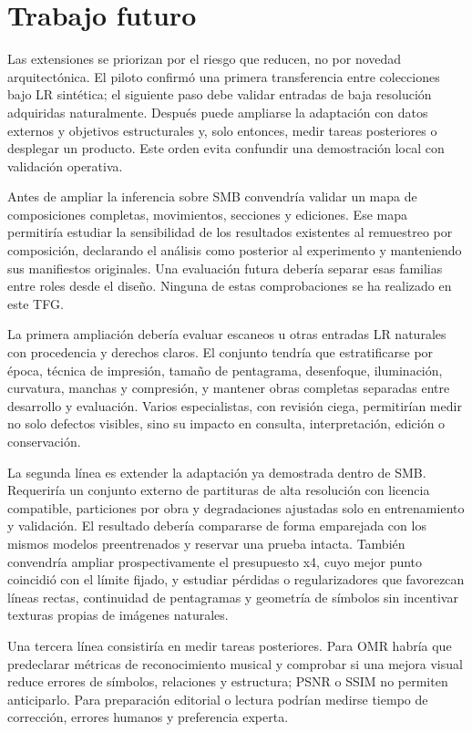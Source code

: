 \chapter{Trabajo futuro}

Las extensiones se priorizan por el riesgo que reducen, no por novedad arquitectónica. El piloto
confirmó una primera transferencia entre colecciones bajo LR sintética; el siguiente paso debe
validar entradas de baja resolución adquiridas naturalmente. Después puede ampliarse la adaptación
con datos externos y objetivos estructurales y, solo entonces, medir tareas posteriores o desplegar
un producto. Este orden evita confundir una demostración local con validación operativa.

Antes de ampliar la inferencia sobre SMB convendría validar un mapa de composiciones completas,
movimientos, secciones y ediciones. Ese mapa permitiría estudiar la sensibilidad de los resultados
existentes al remuestreo por composición, declarando el análisis como posterior al experimento y
manteniendo sus manifiestos originales. Una evaluación futura debería separar esas familias entre
roles desde el diseño. Ninguna de estas comprobaciones se ha realizado en este TFG.

La primera ampliación debería evaluar escaneos u otras entradas LR naturales con procedencia y
derechos claros. El conjunto tendría que estratificarse por época, técnica de impresión, tamaño de
pentagrama, desenfoque, iluminación, curvatura, manchas y compresión, y mantener obras completas
separadas entre desarrollo y evaluación. Varios especialistas, con revisión ciega, permitirían
medir no solo defectos visibles, sino su impacto en consulta, interpretación, edición o
conservación.

La segunda línea es extender la adaptación ya demostrada dentro de SMB. Requeriría un conjunto
externo de partituras de alta resolución con licencia compatible, particiones por obra y
degradaciones ajustadas solo en entrenamiento y validación. El resultado debería compararse de
forma emparejada con los mismos modelos preentrenados y reservar una prueba intacta. También
convendría ampliar prospectivamente el presupuesto x4, cuyo mejor punto coincidió con el límite
fijado, y estudiar pérdidas o regularizadores que favorezcan líneas rectas, continuidad de
pentagramas y geometría de símbolos sin incentivar texturas propias de imágenes naturales.

Una tercera línea consistiría en medir tareas posteriores. Para OMR habría que predeclarar métricas
de reconocimiento musical y comprobar si una mejora visual reduce errores de símbolos, relaciones
y estructura; PSNR o SSIM no permiten anticiparlo. Para preparación editorial o lectura podrían
medirse tiempo de corrección, errores humanos y preferencia experta.

